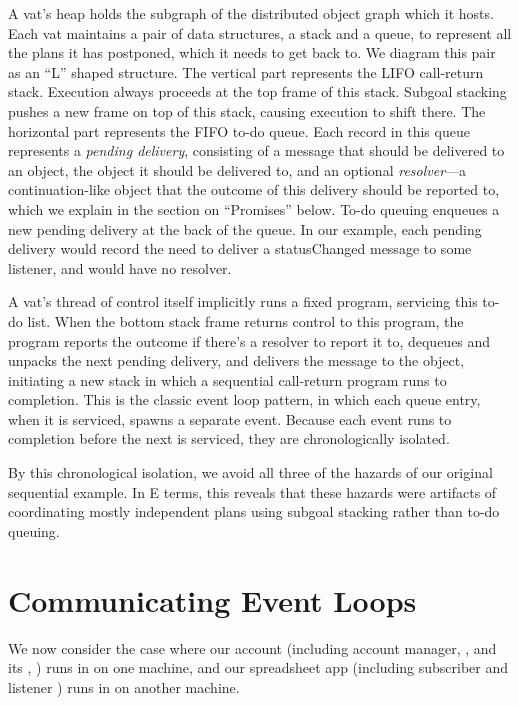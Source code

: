 \documentclass{llncs}
\begin{document}
A vat's heap holds the subgraph of the distributed object graph which
it hosts. Each vat maintains a pair of data structures, a stack and a
queue, to represent all the plans it has postponed, which it needs to
get back to. We diagram this pair as an ``L'' shaped structure. The
vertical part represents the LIFO call-return stack. Execution always
proceeds at the top frame of this stack. Subgoal stacking pushes a new
frame on top of this stack, causing execution to shift there. The
horizontal part represents the FIFO to-do queue. Each record in this
queue represents a \emph{pending delivery}, consisting of a message
that should be delivered to an object, the object it should be
delivered to, and an optional \emph{resolver}---a continuation-like
object that the outcome of this delivery should be reported to, which
we explain in the section on ``Promises'' below. To-do queuing
enqueues a new pending delivery at the back of the queue. In our
example, each pending delivery would record the need to deliver a
statusChanged message to some listener, and would have no resolver.

A vat's thread of control itself implicitly runs a fixed program,
servicing this to-do list. When the bottom stack frame returns control
to this program, the program reports the outcome if there's a resolver
to report it to, dequeues and unpacks the next pending delivery, and
delivers the message to the object, initiating a new stack in which a
sequential call-return program runs to completion. This is the classic
event loop pattern, in which each queue entry, when it is serviced,
spawns a separate event. Because each event runs to completion before
the next is serviced, they are chronologically isolated.

By this chronological isolation, we avoid all three of the hazards of
our original sequential  example. In E terms, this
reveals that these hazards were artifacts of coordinating mostly
independent plans using subgoal stacking rather than to-do queuing.

\section{Communicating Event Loops}

We now consider the case where our account (including account manager,
, and its , ) runs in  on
one machine, and our spreadsheet app (including subscriber 
and listener ) runs in  on another machine.
\end{document}
